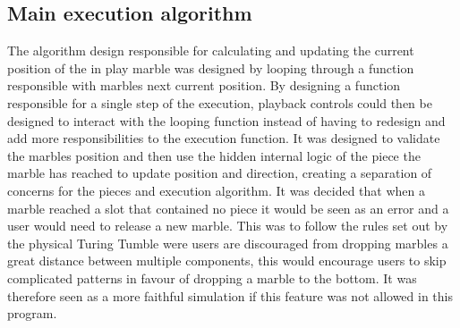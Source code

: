 \documentclass{l4proj}
\begin{document}

\subsection{Main execution algorithm}
The algorithm design responsible for calculating and updating the current position of the in play marble was designed by looping through a function responsible with marbles next current position. By designing a function responsible for a single step of the execution, playback controls could then be designed to interact with the looping function instead of having to redesign and add more responsibilities to the execution function. It was designed to validate the marbles position and then use the hidden internal logic of the piece the marble has reached to update position and direction, creating a separation of concerns for the pieces and execution algorithm. It was decided that when a marble reached a slot that contained no piece it would be seen as an error and a user would need to release a new marble. This was to follow the rules set out by the physical Turing Tumble were users are discouraged from dropping marbles a great distance between multiple components, this would encourage users to skip complicated patterns in favour of dropping a marble to the bottom. It was therefore seen as a more faithful simulation if this feature was not allowed in this program. 
\end{document}
